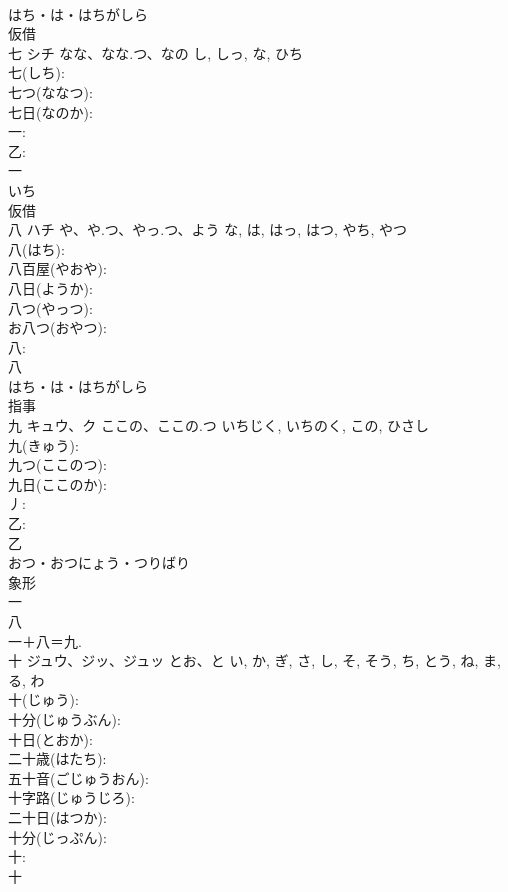 \documentclass[8pt]{extreport}
\begin{document}
\begin{CJK}{UTF8}{min}
\\	はち・は・はちがしら	
\\	仮借 
\\	七	シチ	なな、なな.つ、なの	し, しっ, な, ひち	
\\	七(しち): 
\\	七つ(ななつ): 
\\	七日(なのか): 
\\	一: 
\\	乙: 
\\	一	
\\	いち	
\\	仮借 
\\	八	ハチ	や、や.つ、やっ.つ、よう	な, は, はっ, はつ, やち, やつ	
\\	八(はち): 
\\	八百屋(やおや): 
\\	八日(ようか): 
\\	八つ(やっつ): 
\\	お八つ(おやつ): 
\\	八: 
\\	八	
\\	はち・は・はちがしら	
\\	指事 
\\	九	キュウ、ク	ここの、ここの.つ	いちじく, いちのく, この, ひさし	
\\	九(きゅう): 
\\	九つ(ここのつ): 
\\	九日(ここのか): 
\\	丿: 
\\	乙: 
\\	乙	
\\	おつ・おつにょう・つりばり	
\\	象形 
\\	一 
\\	八
\\	一＋八＝九.	
\\	十	ジュウ、ジッ、ジュッ	とお、と	い, か, ぎ, さ, し, そ, そう, ち, とう, ね, ま, る, わ	
\\	十(じゅう): 
\\	十分(じゅうぶん): 
\\	十日(とおか): 
\\	二十歳(はたち): 
\\	五十音(ごじゅうおん): 
\\	十字路(じゅうじろ): 
\\	二十日(はつか): 
\\	十分(じっぷん): 
\\	十: 
\\	十	

\end{CJK}
\end{document}
